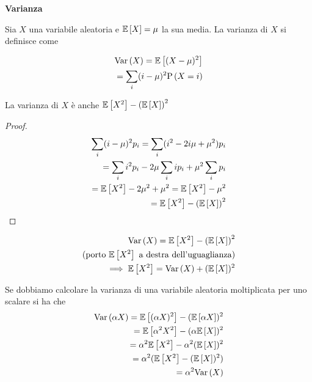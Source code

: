 \begin{defn}
    \textbf{Varianza}
    
    Sia $ X $ una variabile aleatoria e $ \mathbb{E}\left[X\right] = \mu $ la sua media.
    La varianza di $ X $ si definisce come 
    
    \begin{equation*}
    \begin{aligned}
    \text{Var}\left(X\right) = \mathbb{E}\left[(X-\mu)^2\right] \\ 
    = \sum_i (i-\mu)^2 \text{P}\left(X = i\right)
    \end{aligned}
    \end{equation*}
    
    La varianza di $ X $ è anche $ \mathbb{E}\left[X^2\right] - \left(\mathbb{E}\left[X\right]\right)^2 $
    
    \begin{proof}
        \begin{equation*}
        \begin{aligned}
        \sum_i (i-\mu)^2 p_i = \sum_i (i^2 -2i\mu + \mu^2) p_i \\
        = \sum_i i^2 p_i - 2\mu \sum_i i p_i + \mu^2 \sum_i p_i \\
        = \mathbb{E}\left[X^2\right] - 2\mu^2 + \mu^2 = \mathbb{E}\left[X^2\right] - \mu^2 \\
        = \mathbb{E}\left[X^2\right] - \left(\mathbb{E}\left[X\right]\right)^2 
        \end{aligned}
        \end{equation*}
    \end{proof}

    \begin{note}
        \begin{equation*}
        \begin{aligned}
            \text{Var}\left(X\right) = \mathbb{E}\left[X^2\right] - \left(\mathbb{E}\left[X\right]\right)^2 \\
            \text{(porto } \mathbb{E}\left[X^2\right] \text{ a destra dell'uguaglianza)} \\
            \implies \mathbb{E}\left[X^2\right] = \text{Var}\left(X\right) + (\mathbb{E}\left[X\right])^2 
        \end{aligned}
        \end{equation*}
    \end{note}

    \begin{note}
        Se dobbiamo calcolare la varianza di una variabile aleatoria moltiplicata per uno scalare si ha che
        \begin{equation*}
            \begin{aligned}
            \text{Var}\left(\alpha X\right) = \mathbb{E}\left[(\alpha X)^2\right] - (\mathbb{E}\left[\alpha X\right])^2 \\
            = \mathbb{E}\left[\alpha^2 X^2\right] - (\alpha \mathbb{E}\left[X\right])^2 \\
            = \alpha^2 \mathbb{E}\left[X^2\right] - \alpha^2(\mathbb{E}\left[X\right])^2 \\
            = \alpha^2 (\mathbb{E}\left[X^2\right] - (\mathbb{E}\left[X\right])^2) \\
            = \alpha^2 \text{Var}\left(X\right)
            \end{aligned}
        \end{equation*}
    \end{note}
\end{defn}



